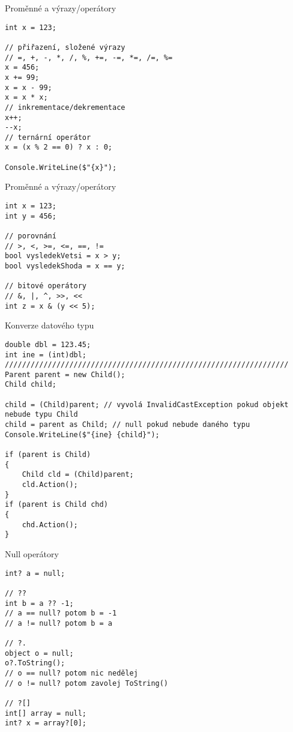 

\begin{frame}[fragile]
\begin{exampleblock}{Proměnné a výrazy/operátory}
\begin{lstlisting}
int x = 123;

// přiřazení, složené výrazy
// =, +, -, *, /, %, +=, -=, *=, /=, %=
x = 456;
x += 99;
x = x - 99;
x = x * x;
// inkrementace/dekrementace
x++;
--x;
// ternární operátor
x = (x % 2 == 0) ? x : 0;

Console.WriteLine($"{x}");
\end{lstlisting}
\end{exampleblock}
\end{frame}


\begin{frame}[fragile]
\begin{exampleblock}{Proměnné a výrazy/operátory}
\begin{lstlisting}
int x = 123;
int y = 456;

// porovnání
// >, <, >=, <=, ==, !=
bool vysledekVetsi = x > y;
bool vysledekShoda = x == y;

// bitové operátory
// &, |, ^, >>, <<
int z = x & (y << 5);

\end{lstlisting}
\end{exampleblock}
\end{frame}



\begin{frame}[fragile]
\begin{exampleblock}{Konverze datového typu}
\begin{lstlisting}[basicstyle=\small]
double dbl = 123.45;
int ine = (int)dbl;
//////////////////////////////////////////////////////////////////
Parent parent = new Child();
Child child;

child = (Child)parent; // vyvolá InvalidCastException pokud objekt nebude typu Child
child = parent as Child; // null pokud nebude daného typu
Console.WriteLine($"{ine} {child}");

if (parent is Child)
{
    Child cld = (Child)parent;
    cld.Action();
}
if (parent is Child chd)
{
    chd.Action();
}
\end{lstlisting}
\end{exampleblock}
\end{frame}



\begin{frame}[fragile]
\begin{exampleblock}{Null operátory}
\begin{lstlisting}
int? a = null;

// ??
int b = a ?? -1;
// a == null? potom b = -1
// a != null? potom b = a

// ?.
object o = null;
o?.ToString();
// o == null? potom nic nedělej
// o != null? potom zavolej ToString()

// ?[]
int[] array = null;
int? x = array?[0];
\end{lstlisting}
\end{exampleblock}
\end{frame}



